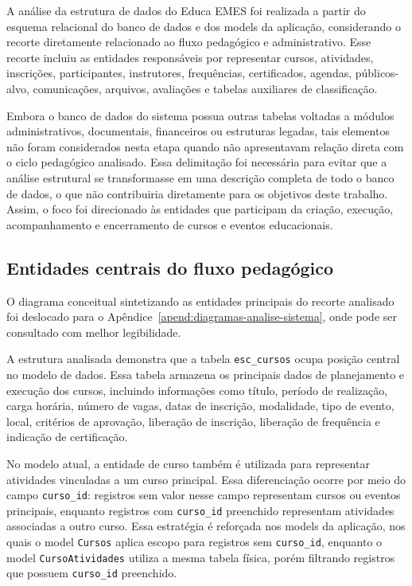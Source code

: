 A análise da estrutura de dados do Educa EMES foi realizada a partir do
esquema relacional do banco de dados e dos models da aplicação,
considerando o recorte diretamente relacionado ao fluxo pedagógico e
administrativo. Esse recorte incluiu as entidades responsáveis por
representar cursos, atividades, inscrições, participantes,
instrutores, frequências, certificados, agendas, públicos-alvo,
comunicações, arquivos, avaliações e tabelas auxiliares de
classificação.

Embora o banco de dados do sistema possua outras tabelas voltadas a
módulos administrativos, documentais, financeiros ou estruturas legadas,
tais elementos não foram considerados nesta etapa quando não
apresentavam relação direta com o ciclo pedagógico analisado. Essa
delimitação foi necessária para evitar que a análise estrutural se
transformasse em uma descrição completa de todo o banco de dados, o que
não contribuiria diretamente para os objetivos deste trabalho. Assim, o
foco foi direcionado às entidades que participam da criação, execução,
acompanhamento e encerramento de cursos e eventos educacionais.

\subsection{Entidades centrais do fluxo pedagógico}
\label{sec:metod:analise_sis:entidades}

O diagrama conceitual sintetizando as entidades principais do recorte
analisado foi deslocado para o
Apêndice~\ref{apend:diagramas-analise-sistema}, onde pode ser consultado
com melhor legibilidade.

A estrutura analisada demonstra que a tabela \texttt{esc\_cursos} ocupa
posição central no modelo de dados. Essa tabela armazena os principais
dados de planejamento e execução dos cursos, incluindo informações como
título, período de realização, carga horária, número de vagas, datas de
inscrição, modalidade, tipo de evento, local, critérios de aprovação,
liberação de inscrição, liberação de frequência e indicação de
certificação.

No modelo atual, a entidade de curso também é utilizada para representar
atividades vinculadas a um curso principal. Essa diferenciação ocorre
por meio do campo \texttt{curso\_id}: registros sem valor nesse campo
representam cursos ou eventos principais, enquanto registros com
\texttt{curso\_id} preenchido representam atividades associadas a outro
curso. Essa estratégia é reforçada nos models da aplicação, nos quais o
model \texttt{Cursos} aplica escopo para registros sem
\texttt{curso\_id}, enquanto o model \texttt{CursoAtividades} utiliza a
mesma tabela física, porém filtrando registros que possuem
\texttt{curso\_id} preenchido.

